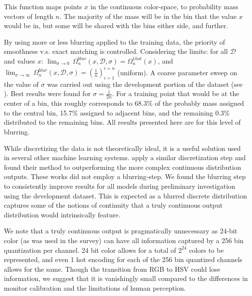 \documentclass[11pt,a4paper]{article}
\newcommand{\compactmath}[1]{\noindent\resizebox{\columnwidth}{!}{$#1$}}
\newcommand{\textcite}{\cite}
\begin{document}
\compactmath{\Omega_{n}^{blur}(x,\mathcal{D},\sigma)=\left(P_{\mathcal{D}}\left(\dfrac{i-1}{n}<Y\le\dfrac{i}{n}\mid M=x,\,\Sigma=\sigma\right)\right)_{i=1}^{i=n}}
This function maps points $x$ in the continuous color-space, to probability mass vectors of length $n$.
The majority of the mass will be in the bin that the value $x$ would be in,
but some will be shared with the bins either side, and further.

By using more or less blurring applied to the training data, the priority of smoothness v.s. exact matching is controlled.
Considering the limits:
for all $\mathcal{D}$ and values $x$: 
\mbox{$\lim_{\sigma \to 0}\, \Omega_n^{blur}(x, \mathcal{D}, \sigma) = \Omega_n^{1hot}(x)$},
and \mbox{$\lim_{\sigma \to \infty}\, \Omega_n^{blur}(x, \mathcal{D}, \sigma) =  \left(\frac{1}{n}\right)_{i=1}^{i=n}$} (uniform).
A coarse parameter sweep on the value of $\sigma$ was carried out using the development portion of the dataset (see ).
Best results were found for $\sigma = \frac{1}{2n}$.
For a training point that would be at the center of a bin, this roughly corresponds to 68.3\% of the probably mass assigned to the central bin, 15.7\% assigned to adjacent bins, and the remaining 0.3\% distributed to the remaining bins.
All results presented here are for this level of blurring.

While discretizing the data is not theoretically ideal, it is a useful solution used in several other machine learning systems.
\textcite{oord2016pixel, DBLP:journals/corr/OordDZSVGKSK16} apply a similar discretization step and found their method to outperforming the more complex continuous distribution outputs.
These works did not employ a blurring-step.
We found the blurring step to consistently improve results for all models during preliminary investigation using the development dataset.
This is expected as a blurred discrete distribution captures some of the notions of continuity that a truly continuous output distribution would intrinsically feature.

We note that a truly continuous output is pragmatically unnecessary as 24-bit color (as was used in the survey) can have all information captured by a 256 bin quantization per channel.
24 bit color allows for a total of $2^{24}$ colors to be represented, and even 1 hot encoding for each of the 256 bin quantized channels allows for the same. Though the transition from RGB to HSV could lose information, we suggest that it is vanishingly small compared to the differences in monitor calibration and the limitations of human perception.
\end{document}
